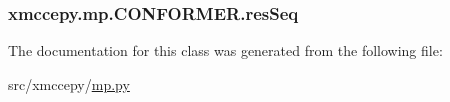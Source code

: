 \hypertarget{classxmccepy_1_1mp_1_1_c_o_n_f_o_r_m_e_r_abd94248291d7e1014b784a61572b9b56}{
\subsubsection[{res\-Seq}]{\setlength{\rightskip}{0pt plus 5cm}xmccepy.\-mp.\-C\-O\-N\-F\-O\-R\-M\-E\-R.\-res\-Seq}}\label{classxmccepy_1_1mp_1_1_c_o_n_f_o_r_m_e_r_abd94248291d7e1014b784a61572b9b56}


The documentation for this class was generated from the following file\-:\begin{DoxyCompactItemize}
\item 
src/xmccepy/\hyperlink{mp_8py}{mp.\-py}\end{DoxyCompactItemize}
